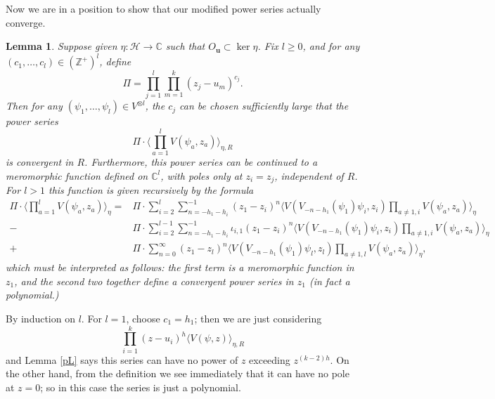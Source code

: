 \documentclass[a4paper,12pt]{article}
\newcommand{\C}{{\mathbb C}}
\newcommand{\Z}{{\mathbb Z}}
\newcommand{\uu}{{\mathbf u}}
\newcommand{\F}{{\mathcal H}}
\newcommand{\IP}[1]{\langle#1\rangle}
\newtheorem{lem}[defn]{Lemma}
\newcommand{\oproof}[1]{\noindent {\bf Proof#1.\ }}
\begin{document}
Now we are in a position to show that our modified power series actually converge.
\begin{lem} \label{modconv} Suppose given $\eta: \F \to \C$ such that $O_\uu \subset \ker \eta$.  Fix $l \ge 0$, and for
any $(c_1, \dots, c_l) \in (\Z^+)^l$, define
\begin{equation}
\Pi = \prod_{j=1}^l \prod_{m=1}^k (z_j - u_m)^{c_j}.
\end{equation}
Then for any $(\psi_1, \dots, \psi_l) \in V^{\otimes l}$, the $c_j$ can be chosen sufficiently large that the power series
\begin{equation}
\Pi \cdot \IP{\prod_{a=1}^l V(\psi_a, z_a)}_{\eta,R}
\end{equation}
is convergent in $R$.  Furthermore, this power series can be continued to a meromorphic function defined on $\C^l$, with poles
only at $z_i = z_j$, independent of $R$.  For $l>1$ this function is given recursively by the formula
\begin{equation} \label{ope5}
\begin{split}
\Pi \cdot \IP{\prod_{a=1}^l V(\psi_a, z_a)}_{\eta}
= & \Pi \cdot \sum_{i=2}^{l} \sum_{n = - h_1 - h_i}^{-1} (z_1 - z_i)^{n} \IP{V(V_{-n-h_1}(\psi_1) \psi_i, z_i) \prod_{a \ne 1,i} V(\psi_a, z_a)}_{\eta} \\
- & \Pi \cdot \sum_{i=2}^{l-1} \sum_{n = - h_1 - h_i}^{-1} \iota_{i,1} (z_1 - z_i)^{n} \IP{V(V_{-n-h_1}(\psi_1) \psi_i, z_i) \prod_{a \ne 1,i} V(\psi_a, z_a)}_{\eta} \\
+ & \Pi \cdot \sum_{n=0}^\infty (z_1 - z_l)^n \IP{V(V_{-n-h_1}(\psi_1) \psi_l, z_l) \prod_{a \ne 1,l} V(\psi_a, z_a)}_{\eta},
\end{split}
\end{equation}
which must be interpreted as follows:  the first term is a meromorphic function in $z_1$,
and the second two together define a convergent power series in $z_1$ (in fact a polynomial.)
\end{lem}

\oproof{} By induction on $l$.  For $l=1$, choose $c_1=h_1$; then we are just considering
\begin{equation}
\prod_{i=1}^k (z - u_i)^{h} \IP{V(\psi, z)}_{\eta,R}
\end{equation}
and Lemma \ref{pL} says this series can have no power of $z$ exceeding $z^{(k-2)h}$.  On the other hand,
from the definition we see immediately that it can have no pole at $z=0$; so in this case the series is just a polynomial. 
\end{document}
